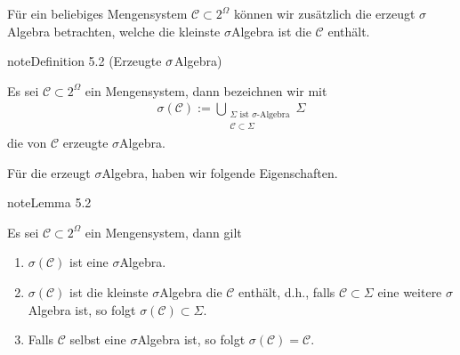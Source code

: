 \documentclass[letterpaper,10pt,german]{jupyterBook}
\begin{document}
\sphinxAtStartPar
Für ein beliebiges Mengensystem \(\mathcal{C}\subset 2^\Omega\) können wir zusätzlich die erzeugt \(\sigma\)\sphinxhyphen{}Algebra betrachten, welche die kleinste \(\sigma\)\sphinxhyphen{}Algebra ist die \(\mathcal{C}\) enthält.
\label{masstheorie/masstheorie:definition-2}
\begin{sphinxadmonition}{note}{Definition 5.2 (Erzeugte \protect\(\sigma\protect\)\sphinxhyphen{}Algebra)}



\sphinxAtStartPar
Es sei \(\mathcal{C}\subset 2^\Omega\) ein Mengensystem, dann bezeichnen wir mit
\begin{equation*}
\begin{split}\sigma(\mathcal{C}) := \bigcup_{\substack{\Sigma \text{ ist $\sigma$-Algebra}\\ \mathcal{C} \subset \Sigma}} \Sigma\end{split}
\end{equation*}
\sphinxAtStartPar
die von \(\mathcal{C}\) erzeugte \(\sigma\)\sphinxhyphen{}Algebra.
\end{sphinxadmonition}

\sphinxAtStartPar
Für die erzeugt \(\sigma\)\sphinxhyphen{}Algebra, haben wir folgende Eigenschaften.
\label{masstheorie/masstheorie:lemma-3}
\begin{sphinxadmonition}{note}{Lemma 5.2}



\sphinxAtStartPar
Es sei \(\mathcal{C}\subset 2^\Omega\) ein Mengensystem, dann gilt
\begin{enumerate}
%
\item {} 
\sphinxAtStartPar
\(\sigma(\mathcal{C})\) ist eine \(\sigma\)\sphinxhyphen{}Algebra.

\item {} 
\sphinxAtStartPar
\(\sigma(\mathcal{C})\) ist die kleinste \(\sigma\)\sphinxhyphen{}Algebra die \(\mathcal{C}\) enthält, d.h., falls \(\mathcal{C}\subset\Sigma\) eine weitere \(\sigma\)\sphinxhyphen{}Algebra ist, so folgt \(\sigma(\mathcal{C})\subset\Sigma\).

\item {} 
\sphinxAtStartPar
Falls \(\mathcal{C}\) selbst eine \(\sigma\)\sphinxhyphen{}Algebra ist, so folgt \(\sigma(\mathcal{C}) = \mathcal{C}\).

\end{enumerate}
\end{sphinxadmonition}
\end{document}
